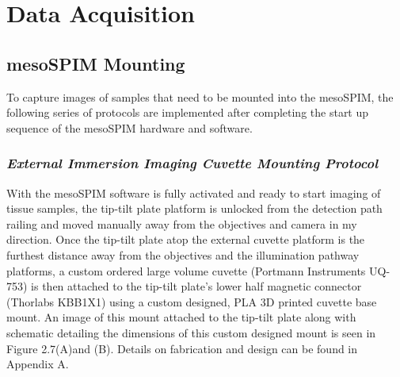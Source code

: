 \section{Data Acquisition}
\subsection{mesoSPIM Mounting}

To capture images of samples that need to be mounted into the mesoSPIM, the following series of protocols are implemented after completing the start up sequence of the mesoSPIM hardware and software. 

\subsubsection{\textit{External Immersion Imaging Cuvette Mounting Protocol}}
With the mesoSPIM software is fully activated and ready to start imaging of tissue samples, the tip-tilt plate platform is unlocked from the detection path railing and moved manually away from the objectives and camera in my direction. Once the tip-tilt plate atop the external cuvette platform is the furthest distance away from the objectives and the illumination pathway platforms, a custom ordered large volume cuvette (Portmann Instruments UQ-753) is then attached to the tip-tilt plate’s lower half magnetic connector (Thorlabs KBB1X1) using a custom designed, PLA 3D printed cuvette base mount. An image of this mount attached to the tip-tilt plate along with schematic detailing the dimensions of this custom designed mount is seen in Figure 2.7(A)and (B). Details on fabrication and design can be found in Appendix A. 

